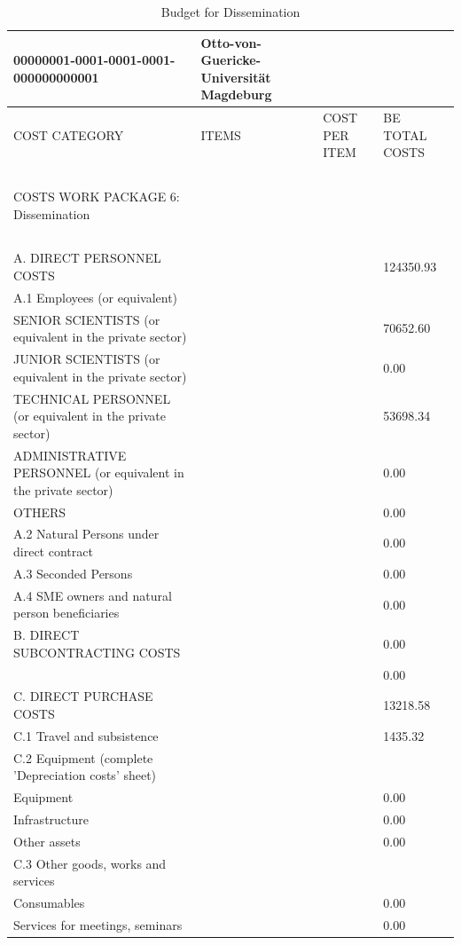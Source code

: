 \begin{table}[H]
\centering
\caption{Budget for Dissemination}
\begin{tabular}{|l|l|l|l|}
\hline
00000001-0001-0001-0001-000000000001 & Otto-von-Guericke-Universität Magdeburg & ~ & ~ \\ \hline
COST CATEGORY & ITEMS & COST PER ITEM & BE TOTAL COSTS \\ \hline
~ & ~ & ~ & ~ \\ \hline
COSTS WORK PACKAGE 6: Dissemination & ~ & ~ & ~ \\ \hline
~ & ~ & ~ & ~ \\ \hline
A. DIRECT PERSONNEL COSTS & ~ & ~ & 124350.93 \\ \hline
A.1 Employees (or equivalent) & ~ & ~ & ~ \\ \hline
SENIOR SCIENTISTS (or equivalent in the private sector) & ~ & ~ & 70652.60 \\ \hline
JUNIOR SCIENTISTS (or equivalent in the private sector) & ~ & ~ & 0.00 \\ \hline
TECHNICAL PERSONNEL (or equivalent in the private sector) & ~ & ~ & 53698.34 \\ \hline
ADMINISTRATIVE PERSONNEL (or equivalent in the private sector) & ~ & ~ & 0.00 \\ \hline
OTHERS & ~ & ~ & 0.00 \\ \hline
A.2 Natural Persons under direct contract & ~ & ~ & 0.00 \\ \hline
A.3 Seconded Persons & ~ & ~ & 0.00 \\ \hline
A.4 SME owners and natural person beneficiaries & ~ &  & 0.00 \\ \hline
B. DIRECT SUBCONTRACTING COSTS & ~ & ~ & 0.00\\ \hline
~ & ~ & ~ & 0.00 \\ \hline
C. DIRECT PURCHASE COSTS & ~ & ~ & 13218.58 \\ \hline
C.1 Travel and subsistence & ~ &  & 1435.32 \\ \hline
C.2 Equipment (complete 'Depreciation costs' sheet) & ~ & ~ & ~ \\ \hline
Equipment & ~ &  & 0.00 \\ \hline
Infrastructure & ~ &  & 0.00 \\ \hline
Other assets & ~ &  & 0.00 \\ \hline
C.3 Other goods, works and services & ~ & ~ & ~ \\ \hline
Consumables & ~ &  & 0.00 \\ \hline
Services for meetings, seminars & ~ & ~ & 0.00 \\ \hline

\end{tabular}
\end{table}
